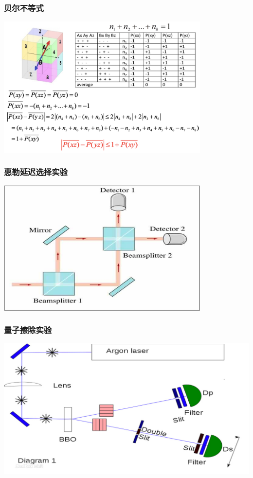 \begin{frame}
    \frametitle{贝尔不等式}
    \begin{center}
        \includegraphics[width=0.8\textwidth]{figs/bell.png} \\
    \end{center} 
\end{frame}

\begin{frame}
    \frametitle{惠勒延迟选择实验}
    \begin{center}
        \includegraphics[width=0.8\textwidth]{figs/choose.png} \\
    \end{center} 
\end{frame}

\begin{frame}
    \frametitle{量子擦除实验}
    \begin{center}
        \includegraphics[width=1.0\textwidth]{figs/chachuexp.png} \\
    \end{center} 
\end{frame}

